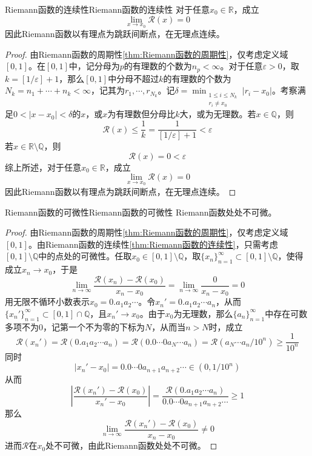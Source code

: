 \documentclass[lang = cn, scheme = chinese, thmcnt = section]{elegantbook}
\newcommand{\R}{\mathbb{R}}            %
\newcommand{\Q}{\mathbb{Q}}            %
\newcommand{\sub}{\subset}             %
\begin{document}
\begin{theorem}{Riemann函数的连续性}{Riemann函数的连续性}
	对于任意$x_0\in\R$，成立
	$$
	\lim_{x\to x_0}\mathcal{R}(x)=0
	$$
	因此Riemann函数以有理点为跳跃间断点，在无理点连续。
\end{theorem}

\begin{proof}
	由Riemann函数的周期性\ref{thm:Riemann函数的周期性}，仅考虑定义域$[0,1]$。在$[0,1]$中，记分母为$p$的有理数的个数为$n_p<\infty$。对于任意$\varepsilon>0$，取$k=[1/\varepsilon]+1$，那么$[0,1]$中分母不超过$k$的有理数的个数为$N_k=n_1+\cdots+n_k<\infty$，记其为$r_1,\cdots,r_{N_k}$。记$\displaystyle \delta=\min_{\substack{1\le i \le N_k\\r_i\ne x_0}}|r_i-x_0|$。考察满足$0<|x-x_0|<\delta$的$x$，或$x$为有理数但分母比$k$大，或为无理数。若$x\in\Q$，则
	$$
	\mathcal{R}(x)\le\frac{1}{k}=
	\frac{1}{[1/\varepsilon]+1}
	<\varepsilon
	$$
	若$x\in\R\setminus\Q$，则
	$$
	\mathcal{R}(x)=
	0
	<\varepsilon
	$$
	综上所述，对于任意$x_0\in\R$，成立
	$$
	\lim_{x\to x_0}\mathcal{R}(x)=0
	$$
	因此Riemann函数以有理点为跳跃间断点，在无理点连续。
\end{proof}

\begin{theorem}{Riemann函数的可微性}{Riemann函数的可微性}
	Riemann函数处处不可微。
\end{theorem}

\begin{proof}
	由Riemann函数的周期性\ref{thm:Riemann函数的周期性}，仅考虑定义域$[0,1]$。由Riemann函数的连续性\ref{thm:Riemann函数的连续性}，只需考虑$[0,1]\setminus\Q$中的点处的可微性。任取$x_0\in [0,1]\setminus\Q$，取$\{ x_n \}_{n=1}^{\infty}\sub [0,1]\setminus\Q$，使得成立$x_n\to x_0$，于是%
	$$
	\lim_{n\to \infty}\frac{\mathcal{R}(x_n)-\mathcal{R}(x_0)}{x_n-x_0}
	=\lim_{n\to\infty}\frac{0}{x_n-x_0}=0
	$$
	用无限不循环小数表示$x_0=0.a_1a_2\cdots$。令$x_n'=0.a_1a_2\cdots a_n$，从而$\{ x_n' \}_{n=1}^{\infty}\sub [0,1]\cap\Q$，且$x_n'\to x_0$。由于$x_0$为无理数，那么$\{ a_n \}_{n=1}^{\infty}$中存在可数多项不为$0$，记第一个不为零的下标为$N$，从而当$n>N$时，成立%
	$$
	\mathcal{R}(x_n')
	=\mathcal{R}(0.a_1a_2\cdots a_n)
	=\mathcal{R}(0.0\cdots0a_N\cdots a_n)
	=\mathcal{R}(a_N\cdots a_n/10^n)
	\ge\frac{1}{10^n}
	$$
	同时%
	$$
	|x_n'-x_0|
	=0.0\cdots0a_{n+1}a_{n+2}\cdots\in(0,1/10^n)
	$$
	从而%
	$$
	\left|\frac{\mathcal{R}(x_n')-\mathcal{R}(x_0)}{x_n'-x_0}\right|
	=\frac{\mathcal{R}(0.a_1a_2\cdots a_n)}{0.0\cdots0a_{n+1}a_{n+2}\cdots}
	\ge 1
	$$
	那么
	$$
	\lim_{n\to \infty}\frac{\mathcal{R}(x_n')-\mathcal{R}(x_0)}{x_n-x_0}
	\ne 0
	$$
	进而$\mathcal{R}$在$x_0$处不可微，由此Riemann函数处处不可微。
\end{proof}
\end{document}
